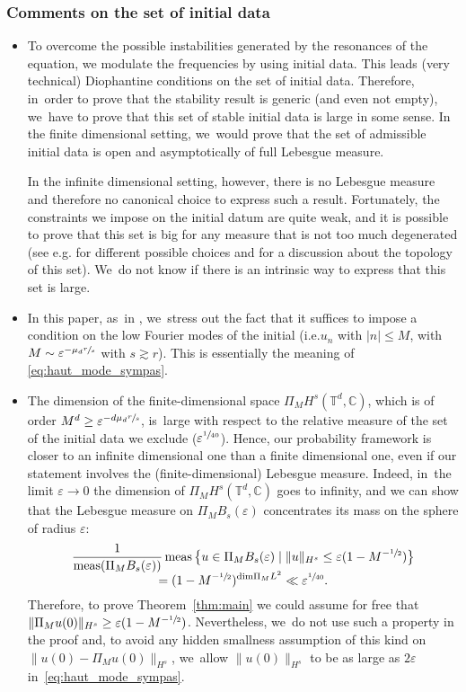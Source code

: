 \documentclass[10pt,a4paper]{amsart}
\providecommand{\ie}{i.e.}
\providecommand{\eg}{e.g.}
\theoremstyle{plain}
\theoremstyle{definition}
\DeclareMathOperator{\meas}{meas}
\newcommand{\C}{\mathbb{C}}
\newcommand{\T}{\mathbb{T}}
\newcommand{\1}{\mathbf{1}}
\let\epsilon\varepsilon
\providecommand{\Subsubsection}{\subsubsection}
\providecommand{\Subsubsection}{\subsubsection}
\begin{document}
\Subsubsection{Comments on the set of initial data} \label{sub:proba}
\begin{itemize}
\item To overcome the possible instabilities generated by the resonances of the equation, we
modulate the frequencies by using initial data. This leads (very technical) Diophantine conditions on the set of initial data. Therefore, in~order to prove that the stability result is generic (and even not empty), we~have to prove that this set of stable initial data is large in some sense. In the finite dimensional setting, we~would prove that the set of admissible initial data is open and asymptotically of full Lebesgue measure.

In the infinite dimensional setting, however, there is no Lebesgue measure and therefore no canonical choice to express such a result. Fortunately, the constraints we impose on the initial datum are quite weak, and it is possible to prove that this set is big for any measure that is not too much degenerated (see \eg \cite{KillBill,KtA,LX23,zhiqiang} for different possible choices and \cite{KtA} for a discussion about the topology of this set). We~do not know if there is an intrinsic way to express that this set is large.

\item In this paper, as~in \cite{zhiqiang}, we~stress out the fact that it suffices to impose a condition on the low Fourier modes of the initial (\ie $u_n$ with $|n|\leq M$, with $M\sim \varepsilon^{- \mu_d \sfrac{r}s}$ with $s\gtrsim r$). This is essentially the meaning of \eqref{eq:haut_mode_sympas}.

\item
The dimension of the finite-dimensional space $\Pi_{M}H^{s}(\T^{d}, \C)$, which is of order $M^d \geq \varepsilon^{- d\mu_d \sfrac{r}s}$, is~large with respect to the relative measure of the set of the initial data we exclude ($\varepsilon^{\sfrac{1}{40}}$). Hence, our probability framework is closer to an infinite dimensional one than a finite dimensional one, even if our statement involves the (finite-dimensional) Lebesgue measure.
Indeed, in~the limit $\epsilon\to0$ the dimension of $\Pi_{M}H^{s}(\T^{d},\C)$ goes to infinity, and we can show that the Lebesgue measure on $\Pi_{M}B_{s}(\epsilon)$ concentrates its mass on the sphere of radius $\epsilon$:\vspace*{-5pt}\enlargethispage{\baselineskip}
\begin{multline*}
\frac{1}{\meas(\Pi_{M}B_{s}(\epsilon))}
\meas
\big\{
u\in\Pi_{M}B_{s}(\epsilon)\mid \|u\|_{H^{s}}\leq \epsilon(1-M^{-\sfrac{1}{2}})
\big\}
\\[
-5pt]
=
(1- M^{-\sfrac{1}{2}})^{\mathrm{dim} \Pi_{M}L^2}
\ll
\epsilon^{\sfrac{1}{40}}.
\end{multline*}
Therefore, to prove Theorem~\ref{thm:main} we could assume for free that $\| \Pi_M u(0) \|_{H^s} \geq \varepsilon (1-\nobreak M^{-\sfrac{1}{2}})$. Nevertheless, we~do not use such a property in the proof and, to avoid any hidden smallness assumption of this kind on $\| u(0) - \Pi_M u(0)\|_{H^s}$, we~allow $\|u(0)\|_{H^s}$ to be as large as $2\varepsilon$ in~\eqref{eq:haut_mode_sympas}.


\end{itemize}
\end{document}
